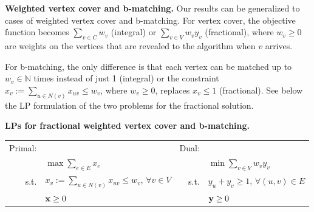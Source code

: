 \documentclass{article}
\newcommand{\bx}{{\bf{x}}}
\newcommand{\by}{{\bf{y}}}
\begin{document}

{\bf Weighted vertex cover and b-matching.} Our results can be generalized to cases of weighted vertex cover and b-matching.
For vertex cover, the objective function becomes $\sum_{v\in C}w_v$ (integral) or $\sum_{v\in V}w_vy_v$ (fractional), where $w_v\geq 0$ are weights on the vertices that are revealed to the algorithm when $v$ arrives.

For b-matching, the only difference is that each vertex can be matched up to $w_v\in\mathbb{N}$ times instead of just 1 (integral) or the constraint $x_v:=\sum_{u\in N(v)}x_{uv}\leq w_v$, where $w_v\geq 0$, replaces $x_v\leq 1$ (fractional). See below the LP formulation of the two problems for the fractional solution. 

{\bf LPs for fractional weighted vertex cover and b-matching.}

\begin{center}
\begin{tabular}{ | r l | r l | }
\hline
Primal: & & Dual: &\\
 & $\max\sum_{e\in E} x_e$ &  & $\min\sum_{v\in V}w_vy_v$ \\
s.t. & $ x_v:=\sum_{u\in N(v)} x_{uv}\leq w_v,\, \forall v\in V$ & s.t. & $y_u+y_v\geq 1,\, \forall (u,v)\in E$ \\
&  $\bx\geq 0$ & & $\by\geq 0$ \\
\hline
\end{tabular}
\end{center}


\end{document}
